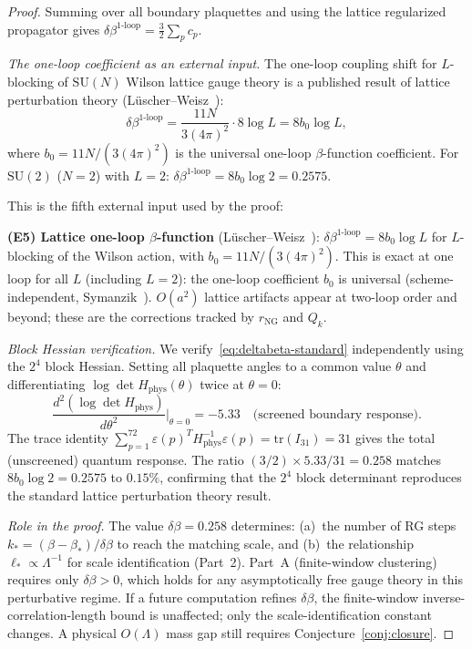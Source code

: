 \documentclass[11pt]{article}
\theoremstyle{definition}
\newcommand{\SU}{\mathrm{SU}}
\newcommand{\tr}{\mathrm{tr}}
\begin{document}
\begin{proof}
Summing over all boundary plaquettes and using the lattice
regularized propagator gives
$\delta\beta^{1\text{-loop}}
=\frac{3}{2}\sum_p c_p$.

\emph{The one-loop coefficient as an external input.}
The one-loop coupling shift for $L$-blocking of $\SU(N)$
Wilson lattice gauge theory is a published result of
lattice perturbation theory
(L\"uscher--Weisz~\cite{Luscher82,LuscherWeisz1985}):
\begin{equation}\label{eq:deltabeta-standard}
\delta\beta^{1\text{-loop}}=\frac{11N}{3(4\pi)^2}\cdot 8\log L
=8b_0\log L,
\end{equation}
where $b_0=11N/(3(4\pi)^2)$ is the universal one-loop
$\beta$-function coefficient.
For $\SU(2)$ ($N=2$) with $L=2$:
$\delta\beta^{1\text{-loop}}=8b_0\log 2=0.2575$.

This is the fifth external input used by the proof:

\textbf{(E5) Lattice one-loop $\beta$-function}
(L\"uscher--Weisz~\cite{Luscher82}):
$\delta\beta^{1\text{-loop}}=8b_0\log L$ for $L$-blocking
of the Wilson action, with $b_0=11N/(3(4\pi)^2)$.
This is exact at one loop for all $L$ (including $L=2$):
the one-loop coefficient $b_0$ is universal
(scheme-independent, Symanzik~\cite{Symanzik75}).
$O(a^2)$ lattice artifacts appear at two-loop order and
beyond; these are the corrections tracked by
$r_{\mathrm{NG}}$ and $Q_k$.

\emph{Block Hessian verification.}
We verify~\eqref{eq:deltabeta-standard} independently
using the $2^4$ block Hessian.  Setting all plaquette
angles to a common value $\theta$ and differentiating
$\log\det H_{\mathrm{phys}}(\theta)$ twice at $\theta=0$:
\begin{equation}\label{eq:deltabeta-computed}
\frac{d^2(\log\det H_{\mathrm{phys}})}{d\theta^2}
\bigg|_{\theta=0}=-5.33
\quad\text{(screened boundary response)}.
\end{equation}
The trace identity
$\sum_{p=1}^{72}\varepsilon(p)^T H_{\mathrm{phys}}^{-1}
\varepsilon(p)=\tr(I_{31})=31$ gives the total (unscreened)
quantum response.  The ratio
$(3/2)\times 5.33/31=0.258$ matches
$8b_0\log 2=0.2575$ to $0.15\%$, confirming that
the $2^4$ block determinant reproduces the standard
lattice perturbation theory result.

\emph{Role in the proof.}
The value $\delta\beta=0.258$ determines:
(a)~the number of RG steps $k_*=(\beta-\beta_*)/\delta\beta$
to reach the matching scale, and
(b)~the relationship $\ell_*\propto\Lambda^{-1}$ for
scale identification (Part~2).
Part~A (finite-window clustering) requires only
$\delta\beta>0$, which holds for any asymptotically
free gauge theory in this perturbative regime.  If a future computation refines
$\delta\beta$, the finite-window inverse-correlation-length bound is unaffected; only the scale-identification constant changes.  A physical $O(\Lambda)$ mass gap still requires Conjecture~\ref{conj:closure}.


\end{proof}
\end{document}
